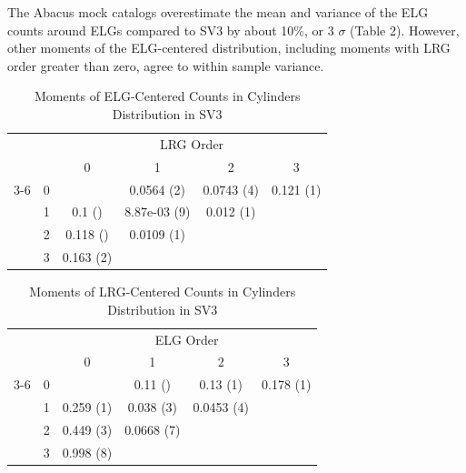 \documentclass[fleqn,usenatbib]{mnras}
\begin{document}
The Abacus mock catalogs overestimate the mean and variance of the ELG counts around ELGs compared to SV3 by about 10\%, or 3 $\sigma$ (Table 2). However, other moments of the ELG-centered distribution, including moments with LRG order greater than zero, agree to within sample variance. 


    \begin{table}
    \caption{Moments of ELG-Centered Counts in Cylinders Distribution in SV3}
    \begin{tabular}{ c  c  c  c c c}
    \multicolumn{2}{c}{}&\multicolumn{4}{c}{LRG Order}\\
     \multicolumn{1}{c}{}& &  0&1&  2 &3\\ \cline{3-6}
    
    \multirow[|l|]{4}{*}{\rotatebox[origin=c]{90}{ELG Order}}& \multicolumn{1}{c|}{0} && 0.0564 (2) & 0.0743 (4)&0.121 (1)\\
     & \multicolumn{1}{c|}{1} &0.1 ()&8.87e-03 (9)&0.012 (1)&\multicolumn{1}{c}{}\\
    
     &\multicolumn{1}{c|}{2} & 0.118 ()&0.0109 (1)& \multicolumn{2}{c}{}\\
     &\multicolumn{1}{c|}{3} &0.163 (2)& \multicolumn{2}{c}{}\\
    
    \end{tabular}
    
    \end{table}

    \begin{table}
    \caption{Moments of LRG-Centered Counts in Cylinders Distribution in SV3}
    \begin{tabular}{ c  c  c  c c c}
    \multicolumn{2}{c}{}&\multicolumn{4}{c}{ELG Order}\\
     \multicolumn{1}{c}{}& &  0&1&  2 &3\\ \cline{3-6}
    
    \multirow[|l|]{4}{*}{\rotatebox[origin=c]{90}{LRG Order}}& \multicolumn{1}{c|}{0} && 0.11 () & 0.13 (1)&0.178 (1)\\
     & \multicolumn{1}{c|}{1} &0.259 (1)&0.038 (3)&0.0453 (4)&\multicolumn{1}{c}{}\\
    
     &\multicolumn{1}{c|}{2} & 0.449 (3)&0.0668 (7)& \multicolumn{2}{c}{}\\
     &\multicolumn{1}{c|}{3} &0.998 (8)& \multicolumn{2}{c}{}\\
    
    \end{tabular}
    
    \end{table}
\end{document}
